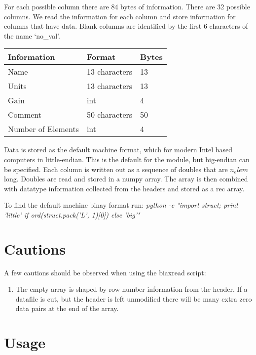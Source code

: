 For each possible column there are 84 bytes of information.  There are 32 possible columns.  We read the information for each column and store information for columns that have data.  Blank columns are identified by the first 6 characters of the name `no\_val'.  

\begin{table}[h]
	\begin{center}
	\begin{tabular}{| l | l | l |}
		\hline
		Information & Format & Bytes\\
		\hline
		Name & 13 characters &  13\\
		\hline
		Units & 13 characters &  13 \\
		\hline
		Gain & int & 4\\
		\hline
		Comment & 50 characters & 50\\
		\hline
		Number of Elements & int & 4\\
		\hline
	\end{tabular}
	\end{center}
	\label{BinaryColHeadFormat}
\end{table}

Data is stored as the default machine format, which for modern Intel based computers in little-endian.  This is the default for the module, but big-endian can be specified.  Each column is written out as a sequence of doubles that are $n_elem$ long.  Doubles are read and stored in a numpy array.  The array is then combined with datatype information collected from the headers and stored as a rec array.

To find the default machine binay format run: \emph{python -c "import struct; print 'little' if ord(struct.pack('L', 1)[0]) else 'big'"}

\section{Cautions}
A few cautions should be observed when using the biaxread script:

\begin{enumerate}
\item The empty array is shaped by row number information from the header.  If a datafile is cut, but the header is left unmodified there will be many extra zero data pairs at the end of the array.
\end{enumerate}

\section{Usage}

